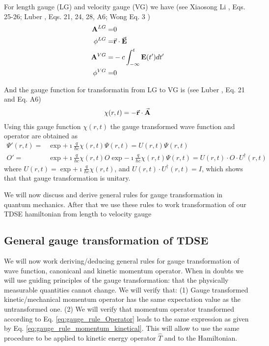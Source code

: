 \documentclass[11pt]{article}
\begin{document}



For length gauge (LG) and velocity gauge (VG) we  have (see Xiaosong Li \cite{Xiaosong-Li-2011-gauge}, Eqs. 25-26;   Luber \cite{Luber-rt-tddft}, Eqs. 21, 24, 28, A6; Wong   \cite{rt-DFTB-Wong-2023} Eq. 3 )
\begin{align*}
    \vb  A^{LG} = &  0 \\
    \phi^{LG}   = & \vec{ \vb r} \cdot \vec{\vb E} \\
    \vb  A^{VG} = &  -c \int_{-\infty}^{t}  \vb E(t') dt' \\
    \phi^{VG}   = & 0
\end{align*}


And the gauge function for transformatin from LG to VG is (see  Luber \cite{Luber-rt-tddft}, Eq. 21 and Eq. A6)
\begin{align*}
\chi(r,t) = -  \vec{ \vb r} \cdot \vec{\vb A}
\end{align*}
Using this gauge function $\chi(r,t)$ the  gauge transformed wave function and operator are  obtained as
\begin{align*}
    \Psi'(r,t) =& \exp{+\imath \frac{q}{\hbar c} \chi(r,t)} \Psi(r,t)= U(r,t) \Psi(r,t)\\
    O'         =&  \exp{+\imath \frac{q}{\hbar c} \chi(r,t)}  O  \exp{-\imath \frac{q}{\hbar c} \chi(r,t)} \Psi(r,t)=   U(r,t) \cdot O \cdot U^\dag(r,t)
\end{align*}
where $U(r,t) =\exp{+\imath \frac{q}{\hbar c}\chi(r,t)}$, and   $U(r,t)\cdot U^\dag (r,t)=I$, which shows that  that gauge transformation is unitary.

We will now discuss and derive general rules for  gauge transformation in quantum mechanics. After that we   use these rules  to work transformation of our TDSE hamiltonian from length to velocity gauge

\subsection{ General gauge transformation of TDSE }


We will now work  deriving/deducing general rules for gauge transformation of  wave function, canonicanl and  kinetic momentum operator. When in doubts we will use guiding  principles of the gauge transformation: that the physically measurable quantities cannot change.
We will verify that:  (1) Gauge transformed   kinetic/mechanical momentum operator has the same expectation  value   as the untransformed one. (2) We will verify that  momentum operator transformed  according to  Eq. \ref{eq:gauge_rule_Operator} leads to the same  expression as given by Eq. \ref{eq:gauge_rule_momentum_kinetical}. This will allow to use the same procedure to  be applied to kinetic energy operator  $\hat T$ and to the Hamiltonian.
\end{document}
